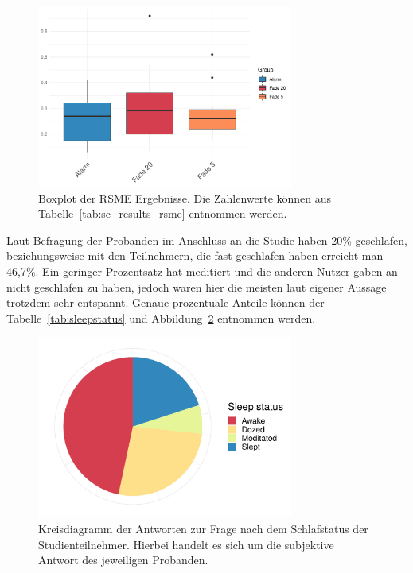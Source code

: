 \begin{figure}[H]
	\centering
	\includegraphics[width=0.75\textwidth]{./_StudyResults/rsme}
	\caption{Boxplot der RSME Ergebnisse. Die Zahlenwerte können aus Tabelle~\ref{tab:sc_results_rsme} entnommen werden.}
	\label{fig:rsme_vis}
\end{figure}

Laut Befragung der Probanden im Anschluss an die Studie haben 20\% geschlafen, beziehungsweise mit den Teilnehmern, die fast geschlafen haben erreicht man 46,7\%. Ein geringer Prozentsatz hat meditiert und die anderen Nutzer gaben an nicht geschlafen zu haben, jedoch waren hier die meisten laut eigener Aussage trotzdem sehr entspannt. Genaue prozentuale Anteile können der Tabelle~\ref{tab:sleepstatus} und Abbildung~\ref{fig:slept} entnommen werden.

\begin{figure}[H]
	\centering
	\includegraphics[width=0.75\textwidth]{./_StudyResults/slept}
	\caption{Kreisdiagramm der Antworten zur Frage nach dem Schlafstatus der Studienteilnehmer. Hierbei handelt es sich um die subjektive Antwort des jeweiligen Probanden.}
	\label{fig:slept}
\end{figure}

